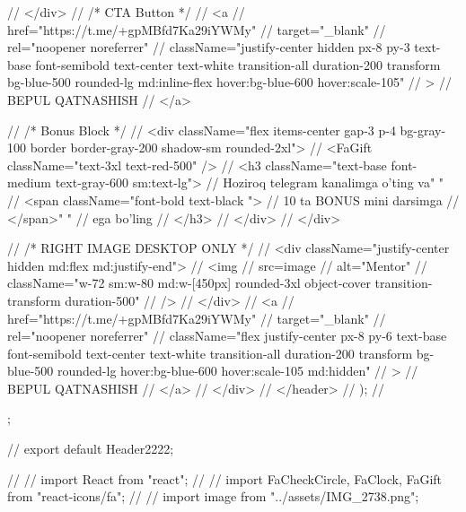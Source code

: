 {//                     </div>
//                     {/* CTA Button */}
//                     <a
//                         href="https://t.me/+gpMBfd7Ka29iYWMy"
//                         target="_blank"
//                         rel="noopener noreferrer"
//                         className="justify-center hidden px-8 py-3 text-base font-semibold text-center text-white transition-all duration-200 transform bg-blue-500 rounded-lg md:inline-flex hover:bg-blue-600 hover:scale-105"
//                     >
//                         BEPUL QATNASHISH
//                     </a>



//                     {/* Bonus Block */}
//                     <div className="flex items-center gap-3 p-4 bg-gray-100 border border-gray-200 shadow-sm rounded-2xl">
//                         <FaGift className="text-3xl text-red-500" />
//                         <h3 className="text-base font-medium text-gray-600 sm:text-lg">
//                             Hoziroq telegram kanalimga o'ting va{" "}
//                             <span className="font-bold text-black ">
//                                 10 ta BONUS mini darsimga
//                             </span>{" "}
//                             ega bo'ling
//                         </h3>
//                     </div>
//                 </div>

//                 {/* RIGHT IMAGE DESKTOP ONLY */}
//                 <div className="justify-center hidden md:flex md:justify-end">
//                     <img
//                         src={image}
//                         alt="Mentor"
//                         className="w-72 sm:w-80 md:w-[450px] rounded-3xl object-cover transition-transform duration-500"
//                     />
//                 </div>
//                 <a
//                     href="https://t.me/+gpMBfd7Ka29iYWMy"
//                     target="_blank"
//                     rel="noopener noreferrer"
//                     className="flex justify-center px-8 py-6 text-base font-semibold text-center text-white transition-all duration-200 transform bg-blue-500 rounded-lg hover:bg-blue-600 hover:scale-105 md:hidden"
//                 >
//                     BEPUL QATNASHISH
//                 </a>
//             </div>
//         </header>
//     );
// };

// export default Header2222;



// // import React from "react";
// // import { FaCheckCircle, FaClock, FaGift } from "react-icons/fa";
// // import image from "../assets/IMG_2738.png";

